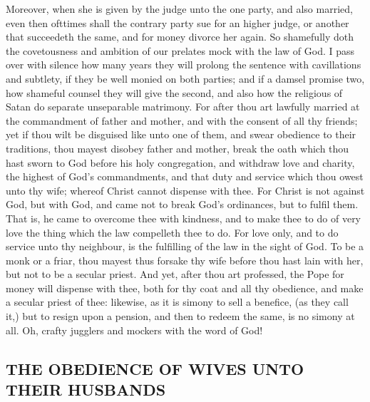 Moreover, when she is given by the judge unto the 
one party, and also married, even then ofttimes shall the 
contrary party sue for an higher judge, or another that 
succeedeth the same, and for money divorce her again. So 
shamefully doth the covetousness and ambition of our 
prelates mock with the law of God. I pass over with 
silence how many years they will prolong the sentence 
with cavillations and subtlety, if they be well monied on
both parties; and if a damsel promise two, how shameful
counsel they will give the second, and also how the religious
of Satan do separate unseparable matrimony. For
after thou art lawfully married at the commandment of 
father and mother, and with the consent of all thy friends;
yet if thou wilt be disguised like unto one of them, and
swear obedience to their traditions, thou mayest disobey
father and mother, break the oath which thou hast sworn
to God before his holy congregation, and withdraw love
and charity, the highest of God's commandments, and 
that duty and service which thou owest unto thy wife;
whereof Christ cannot dispense with thee. For Christ is 
not against God, but with God, and came not to break 
God's ordinances, but to fulfil them. That is, he came 
to overcome thee with kindness, and to make thee to do of 
very love the thing which the law compelleth thee to do. 
For love only, and to do service unto thy neighbour, is the 
fulfilling of the law in the sight of God. To be a monk 
or a friar, thou mayest thus forsake thy wife before thou 
hast lain with her, but not to be a secular priest. And
yet, after thou art professed, the Pope for money will dispense
with thee, both for thy coat and all thy obedience,
and make a secular priest of thee: likewise, as it is 
simony to sell a benefice, (as they call it,) but to resign 
upon a pension, and then to redeem the same, is no simony 
at all. Oh, crafty jugglers and mockers with the word
of God! 


\subsection*{THE OBEDIENCE OF WIVES UNTO THEIR HUSBANDS}

